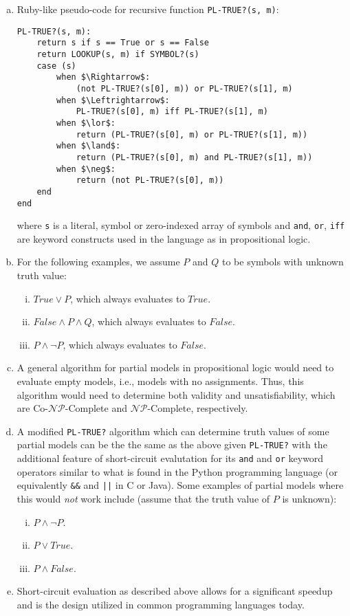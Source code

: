 \documentclass{scrartcl}
\begin{document}
\begin{enumerate}[(a)]
    \item Ruby-like pseudo-code for recursive function \verb|PL-TRUE?(s, m)|:
\begin{lstlisting}
PL-TRUE?(s, m):
    return s if s == True or s == False
    return LOOKUP(s, m) if SYMBOL?(s)
    case (s)
        when $\Rightarrow$:
            (not PL-TRUE?(s[0], m)) or PL-TRUE?(s[1], m)
        when $\Leftrightarrow$:
            PL-TRUE?(s[0], m) iff PL-TRUE?(s[1], m)
        when $\lor$:
            return (PL-TRUE?(s[0], m) or PL-TRUE?(s[1], m))
        when $\land$:
            return (PL-TRUE?(s[0], m) and PL-TRUE?(s[1], m))
        when $\neg$:
            return (not PL-TRUE?(s[0], m))
    end
end
\end{lstlisting}
        where \verb|s| is a literal, symbol or zero-indexed array of symbols and \verb|and|,
        \verb|or|, \verb|iff| are keyword constructs used in the language as in propositional logic.
    \item For the following examples, we assume $P$ and $Q$ to be symbols with unknown truth value:
        \begin{enumerate}[(i)]
            \item $True \lor P$, which always evaluates to $True$.
            \item $False \land P \land Q$, which always evaluates to $False$.
            \item $P \land \neg P$, which always evaluates to $False$.
        \end{enumerate}
    \item A general algorithm for partial models in propositional logic would need to evaluate empty
        models, i.e., models with no assignments. Thus, this algorithm would need to determine both
        validity and unsatisfiability, which are Co-$\mathcal{NP}$-Complete and
        $\mathcal{NP}$-Complete, respectively.
    \item A modified \verb|PL-TRUE?| algorithm which can determine truth values of some partial
        models can be the the same as the above given \verb|PL-TRUE?| with the additional feature of
        short-circuit evalutation for its \verb|and| and \verb|or| keyword operators similar to what
        is found in the Python programming language (or equivalently \verb|&&| and \verb:||: in
        C or Java). Some examples of partial models where this would \emph{not} work include (assume
        that the truth value of $P$ is unknown):
        \begin{enumerate}[(i)]
            \item $P \land \neg P$.
            \item $P \lor True$.
            \item $P \land False$.
        \end{enumerate}
    \item Short-circuit evaluation as described above allows for a significant speedup and is the
        design utilized in common programming languages today.
\end{enumerate}
\end{document}
